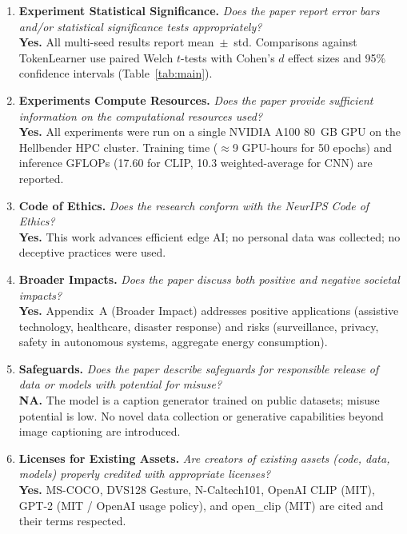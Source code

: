 \documentclass{article}
\begin{document}
\begin{enumerate}
\item \textbf{Experiment Statistical Significance.}
\textit{Does the paper report error bars and/or statistical significance tests appropriately?}\\
\textbf{Yes.} All multi-seed results report mean~$\pm$~std. Comparisons against TokenLearner use paired Welch $t$-tests with Cohen's $d$ effect sizes and 95\% confidence intervals (Table~\ref{tab:main}).

\item \textbf{Experiments Compute Resources.}
\textit{Does the paper provide sufficient information on the computational resources used?}\\
\textbf{Yes.} All experiments were run on a single NVIDIA A100 80~GB GPU on the Hellbender HPC cluster. Training time ($\approx$9 GPU-hours for 50 epochs) and inference GFLOPs (17.60 for CLIP, 10.3 weighted-average for CNN) are reported.

\item \textbf{Code of Ethics.}
\textit{Does the research conform with the NeurIPS Code of Ethics?}\\
\textbf{Yes.} This work advances efficient edge AI; no personal data was collected; no deceptive practices were used.

\item \textbf{Broader Impacts.}
\textit{Does the paper discuss both positive and negative societal impacts?}\\
\textbf{Yes.} Appendix~A (Broader Impact) addresses positive applications (assistive technology, healthcare, disaster response) and risks (surveillance, privacy, safety in autonomous systems, aggregate energy consumption).

\item \textbf{Safeguards.}
\textit{Does the paper describe safeguards for responsible release of data or models with potential for misuse?}\\
\textbf{NA.} The model is a caption generator trained on public datasets; misuse potential is low. No novel data collection or generative capabilities beyond image captioning are introduced.

\item \textbf{Licenses for Existing Assets.}
\textit{Are creators of existing assets (code, data, models) properly credited with appropriate licenses?}\\
\textbf{Yes.} MS-COCO, DVS128 Gesture, N-Caltech101, OpenAI CLIP (MIT), GPT-2 (MIT / OpenAI usage policy), and open\_clip (MIT) are cited and their terms respected.


\end{enumerate}
\end{document}
